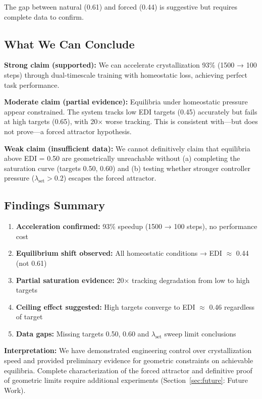 The gap between natural (0.61) and forced (0.44) is suggestive but requires complete data to confirm.

\subsection{What We Can Conclude}

\textbf{Strong claim (supported):} We can accelerate crystallization 93\% (1500 → 100 steps) through dual-timescale training with homeostatic loss, achieving perfect task performance.

\textbf{Moderate claim (partial evidence):} Equilibria under homeostatic pressure appear constrained. The system tracks low EDI targets (0.45) accurately but fails at high targets (0.65), with 20× worse tracking. This is consistent with—but does not prove—a forced attractor hypothesis.

\textbf{Weak claim (insufficient data):} We cannot definitively claim that equilibria above EDI = 0.50 are geometrically unreachable without (a) completing the saturation curve (targets 0.50, 0.60) and (b) testing whether stronger controller pressure ($\lambda_{\text{set}} > 0.2$) escapes the forced attractor.

\subsection{Findings Summary}

\begin{enumerate}
\item \textbf{Acceleration confirmed:} 93\% speedup (1500 → 100 steps), no performance cost
\item \textbf{Equilibrium shift observed:} All homeostatic conditions → EDI $\approx$ 0.44 (not 0.61)
\item \textbf{Partial saturation evidence:} 20× tracking degradation from low to high targets
\item \textbf{Ceiling effect suggested:} High targets converge to EDI $\approx$ 0.46 regardless of target
\item \textbf{Data gaps:} Missing targets 0.50, 0.60 and $\lambda_{\text{set}}$ sweep limit conclusions
\end{enumerate}

\textbf{Interpretation:} We have demonstrated engineering control over crystallization speed and provided preliminary evidence for geometric constraints on achievable equilibria. Complete characterization of the forced attractor and definitive proof of geometric limits require additional experiments (Section~\ref{sec:future}: Future Work).
